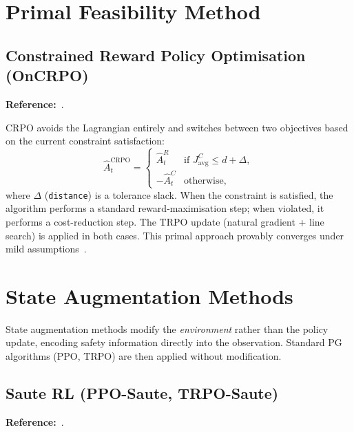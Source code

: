 \documentclass[12pt,a4paper]{article}
\theoremstyle{definition}
\begin{document}
\section{Primal Feasibility Method}
\label{sec:primal}

\subsection{Constrained Reward Policy Optimisation (OnCRPO)}
\label{sec:crpo}

\textbf{Reference:}~\citet{xu2021crpo}.

CRPO avoids the Lagrangian entirely and switches between two objectives based on the
current constraint satisfaction:
\begin{equation}
  \label{eq:crpo_adv}
  \hat{A}_t^{\mathrm{CRPO}} =
  \begin{cases}
    \hat{A}_t^R & \text{if } J^C_{\mathrm{avg}} \leq d + \Delta, \\
    -\hat{A}_t^C & \text{otherwise,}
  \end{cases}
\end{equation}
where $\Delta$ (\texttt{distance}) is a tolerance slack. When the constraint is satisfied,
the algorithm performs a standard reward-maximisation step; when violated, it performs a
cost-reduction step. The TRPO update (natural gradient + line search) is applied in both
cases. This primal approach provably converges under mild assumptions~\citep{xu2021crpo}.

\section{State Augmentation Methods}
\label{sec:stateaug}

State augmentation methods modify the \emph{environment} rather than the policy update,
encoding safety information directly into the observation. Standard PG algorithms (PPO,
TRPO) are then applied without modification.

\subsection{Saute RL (PPO-Saute, TRPO-Saute)}
\label{sec:saute}

\textbf{Reference:}~\citet{sootla2022saute}.
\end{document}
